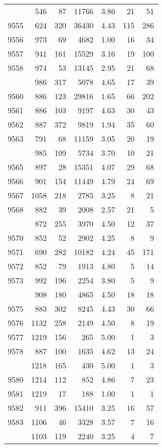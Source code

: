 \documentclass[
]{article}
\begin{document}
\begin{table}
\begin{tabular}[t]{lrrrrrr}
\addlinespace
9554 & 546 & 87 & 11766 & 3.86 & 21 & 51\\
9555 & 624 & 320 & 36430 & 4.43 & 115 & 286\\
9556 & 973 & 69 & 4682 & 1.00 & 16 & 34\\
9557 & 941 & 161 & 15529 & 3.16 & 19 & 100\\
9558 & 974 & 53 & 13145 & 2.95 & 21 & 68\\
\addlinespace
9559 & 986 & 317 & 5078 & 4.65 & 17 & 39\\
9560 & 886 & 123 & 29816 & 1.65 & 66 & 202\\
9561 & 886 & 103 & 9197 & 4.63 & 30 & 43\\
9562 & 887 & 372 & 9819 & 1.94 & 35 & 60\\
9563 & 791 & 68 & 11159 & 3.05 & 20 & 19\\
\addlinespace
9564 & 985 & 109 & 5734 & 3.70 & 10 & 21\\
9565 & 897 & 28 & 15351 & 4.07 & 29 & 68\\
9566 & 901 & 154 & 11449 & 4.79 & 24 & 69\\
9567 & 1058 & 218 & 2785 & 3.25 & 8 & 21\\
9568 & 882 & 39 & 2008 & 2.57 & 21 & 5\\
\addlinespace
9569 & 872 & 255 & 3970 & 4.50 & 12 & 37\\
9570 & 852 & 52 & 2902 & 4.25 & 8 & 9\\
9571 & 690 & 282 & 10182 & 4.24 & 45 & 171\\
9572 & 852 & 79 & 1913 & 4.80 & 5 & 14\\
9573 & 992 & 196 & 2254 & 3.80 & 5 & 9\\
\addlinespace
9574 & 908 & 180 & 4865 & 4.50 & 18 & 18\\
9575 & 883 & 302 & 8245 & 4.43 & 30 & 66\\
9576 & 1132 & 258 & 2149 & 4.50 & 8 & 19\\
9577 & 1219 & 156 & 265 & 5.00 & 1 & 3\\
9578 & 887 & 100 & 1635 & 4.62 & 13 & 24\\
\addlinespace
9579 & 1218 & 165 & 430 & 5.00 & 1 & 3\\
9580 & 1214 & 112 & 852 & 4.86 & 7 & 23\\
9581 & 1219 & 17 & 188 & 1.00 & 1 & 1\\
9582 & 911 & 396 & 15410 & 3.25 & 16 & 57\\
9583 & 1106 & 46 & 3328 & 3.57 & 7 & 16\\
\addlinespace
9584 & 1103 & 119 & 2240 & 3.25 & 4 & 7\\

\end{tabular}
\end{table}
\end{document}
